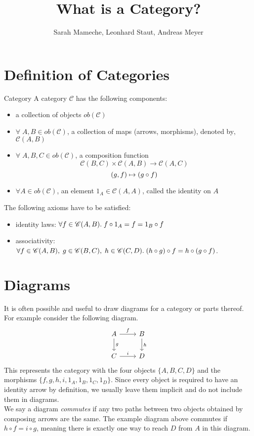 
\def\pathToRoot{../}

\usepackage{charter}
\selectfont


\title{What is a Category?}
\author{Sarah Mameche, Leonhard Staut, Andreas Meyer}
\maketitle

\section {Definition of Categories}
\begin{definition}{Category}
	A category $\mathscr{C}$ has the following components:
	\begin{itemize}
		\item a collection of objects $ob(\mathscr{C})$
		\item $\forall \; A, B \in ob(\mathscr{C})$, a collection of maps (arrows, morphisms), denoted by‚ $\mathscr{C}(A, B)$
		\item $\forall \; A, B, C \in ob(\mathscr{C})$, a composition function
		\[\mathscr{C}(B, C) \times \mathscr{C}(A, B) \rightarrow  \mathscr{C}(A, C)
		\]		\[ (g,f) \mapsto (g \mathbin{\circ} f)
		\]
		\item $\forall A \in ob(\mathscr{C})$, an element $1_A \in \mathscr{C}(A, A)$, called the identity on $A$ 
 	\end{itemize}
 The following axioms have to be satisfied:
 \begin{itemize}
 	\item identity laws: $\forall f \in \mathscr{C}(A, B). \; f \mathbin{\circ} 1_A = f = 1_B \mathbin{\circ} f$ 
 	\item associativity: $\forall f \in \mathscr{C}(A, B), \; g \in \mathscr{C}(B, C), \; h \in \mathscr{C}(C, D). \; (h \mathbin{\circ} g) \mathbin{\circ} f = h \mathbin{\circ} (g \mathbin{\circ} f) $.
 \end{itemize}
\end{definition}

\section {Diagrams}
It is often possible and useful to draw diagrams for a category or parts thereof.
For example consider the following diagram.
\[
  \begin{tikzcd}
    A \arrow{r}{f} \arrow{d}{g} & B \arrow{d}{h} \\
    C \arrow{r}{i}              & D 
  \end{tikzcd}
\]
This represents the category with the four objects $\{A, B, C, D\}$ and
the morphisms $\{f, g, h, i, 1_A, 1_B, 1_C, 1_D \}$.
Since every object is required to have an identity arrow by definition,
we usually leave them implicit and do not include them in diagrams.\\
We say a diagram \emph{commutes} if any two paths between two objects
obtained by composing arrows are the same.
The example diagram above commutes if $ h \circ f = i \circ g $, meaning there is
exactly one way to reach $D$ from $A$ in this diagram.

